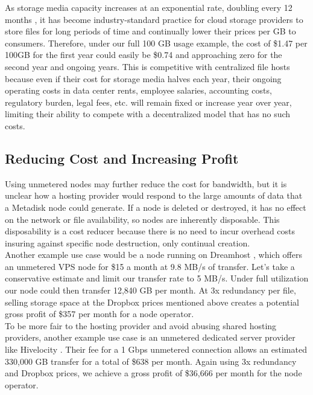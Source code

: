 \documentclass[a4paper,12pt]{article}
\begin{document}
As storage media capacity increases at an exponential rate, doubling every 12 months \cite{17}, it has become industry-standard practice for cloud storage providers to store files for long periods of time and continually lower their prices per GB to consumers. Therefore, under our full 100 GB usage example, the cost of \$1.47 per 100GB for the first year could easily be \$0.74 and approaching zero for the second year and ongoing years. This is competitive with centralized file hosts because even if their cost for storage media halves each year, their ongoing operating costs in data center rents, employee salaries, accounting costs, regulatory burden, legal fees, etc. will remain fixed or increase year over year, limiting their ability to compete with a decentralized model that has no such costs.

\subsection*{Reducing Cost and Increasing Profit}

Using unmetered nodes may further reduce the cost for bandwidth, but it is unclear how a hosting provider would respond to the large amounts of data that a Metadisk node could generate. If a node is deleted or destroyed, it has no effect on the network or file availability, so nodes are inherently disposable. This disposability is a cost reducer because there is no need to incur overhead costs insuring against specific node destruction, only continual creation. \\

Another example use case would be a node running on Dreamhost \cite{9}, which offers an unmetered VPS node for \$15 a month at 9.8 MB/s of transfer. Let’s take a conservative estimate and limit our transfer rate to 5 MB/s. Under full utilization our node could then transfer 12,840 GB per month. At 3x redundancy per file, selling storage space at the Dropbox prices mentioned above creates a potential gross profit of \$357 per month for a node operator. \\

To be more fair to the hosting provider and avoid abusing shared hosting providers, another example use case is an unmetered dedicated server provider like Hivelocity \cite{10}.  Their fee for a 1 Gbps unmetered connection allows an estimated 330,000 GB transfer for a total of \$638 per month. Again using 3x redundancy and Dropbox prices, we achieve a gross profit of \$36,666 per month for the node operator. 
\end{document}
